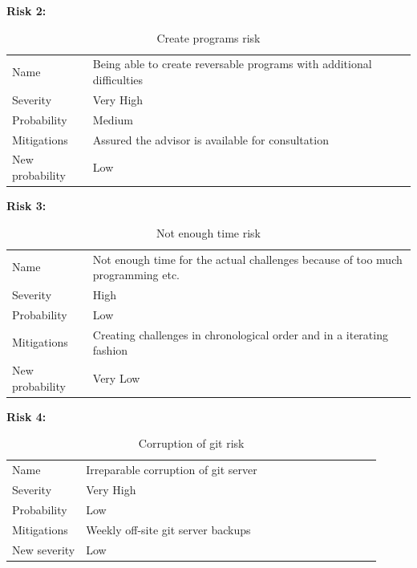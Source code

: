 \begin{table}
  \centering
  \textbf{Risk 2:}
  \begin{tabular}{p{0.2\linewidth}p{0.8\linewidth}}
    Name            & Being able to create reversable programs with additional difficulties           \\
    Severity        & Very High                                 \\
    Probability     & Medium                                   \\
    Mitigations     & Assured the advisor is available for consultation  \\
    New probability & Low                                   
  \end{tabular}
  \caption{Create programs risk}
\end{table}

\begin{table}
  \centering
  \textbf{Risk 3:}
  \begin{tabular}{p{0.2\linewidth}p{0.8\linewidth}}
    Name            & Not enough time for the actual challenges because of too much programming etc.           \\
    Severity        & High                                 \\
    Probability     & Low                                   \\
    Mitigations     & Creating challenges in chronological order and in a iterating fashion  \\
    New probability & Very Low                                   
  \end{tabular}
  \caption{Not enough time risk}
\end{table}

\begin{table}
  \centering
  \textbf{Risk 4:}
  \begin{tabular}{p{0.2\linewidth}p{0.8\linewidth}}
    Name            & Irreparable corruption of git server           \\
    Severity        & Very High                                 \\
    Probability     & Low                                   \\
    Mitigations     & Weekly off-site git server backups  \\
    New severity    & Low                                   
  \end{tabular}
  \caption{Corruption of git risk}
\end{table}

